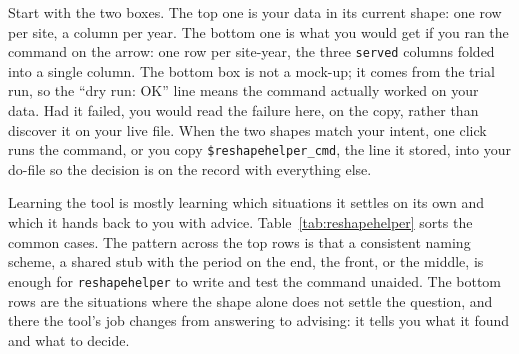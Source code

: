 \documentclass[
    a4paper,
    fontsize=10pt,
    twoside=true,
    numbers=noenddot,
]{kaobook}
\begin{document}
Start with the two boxes. The top one is your data in its current shape: one row per site, a column per year. The bottom one is what you would get if you ran the command on the arrow: one row per site-year, the three \texttt{served} columns folded into a single column. The bottom box is not a mock-up; it comes from the trial run, so the \enquote{dry run: OK} line means the command actually worked on your data. Had it failed, you would read the failure here, on the copy, rather than discover it on your live file. When the two shapes match your intent, one click runs the command, or you copy \texttt{\$reshapehelper\_cmd}, the line it stored, into your do-file so the decision is on the record with everything else.

Learning the tool is mostly learning which situations it settles on its own and which it hands back to you with advice. Table~\ref{tab:reshapehelper} sorts the common cases. The pattern across the top rows is that a consistent naming scheme, a shared stub with the period on the end, the front, or the middle, is enough for \texttt{reshapehelper} to write and test the command unaided. The bottom rows are the situations where the shape alone does not settle the question, and there the tool's job changes from answering to advising: it tells you what it found and what to decide.
\end{document}

